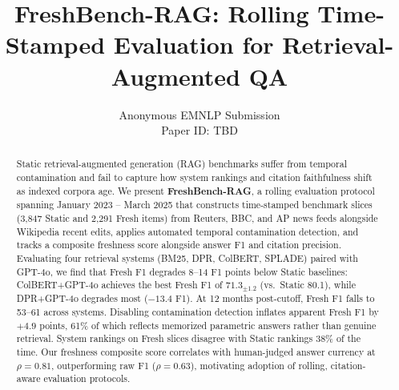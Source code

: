 \documentclass[11pt]{article}
\title{FreshBench-RAG: Rolling Time-Stamped Evaluation for Retrieval-Augmented QA}
\author{Anonymous EMNLP Submission \\ Paper ID: TBD}
\begin{document}
\maketitle

\begin{abstract}
Static retrieval-augmented generation (RAG) benchmarks suffer from temporal contamination and fail to capture how system rankings and citation faithfulness shift as indexed corpora age. We present \textbf{FreshBench-RAG}, a rolling evaluation protocol spanning January 2023 -- March 2025 that constructs time-stamped benchmark slices (3,847 Static and 2,291 Fresh items) from Reuters, BBC, and AP news feeds alongside Wikipedia recent edits, applies automated temporal contamination detection, and tracks a composite freshness score alongside answer F1 and citation precision. Evaluating four retrieval systems (BM25, DPR, ColBERT, SPLADE) paired with GPT-4o, we find that Fresh F1 degrades 8--14 F1 points below Static baselines: ColBERT+GPT-4o achieves the best Fresh F1 of $71.3_{\pm 1.2}$ (vs.\ Static 80.1), while DPR+GPT-4o degrades most ($-13.4$ F1). At 12 months post-cutoff, Fresh F1 falls to 53--61 across systems. Disabling contamination detection inflates apparent Fresh F1 by $+4.9$ points, 61\% of which reflects memorized parametric answers rather than genuine retrieval. System rankings on Fresh slices disagree with Static rankings 38\% of the time. Our freshness composite score correlates with human-judged answer currency at $\rho{=}0.81$, outperforming raw F1 ($\rho{=}0.63$), motivating adoption of rolling, citation-aware evaluation protocols.
\end{abstract}













\appendix





\end{document}
